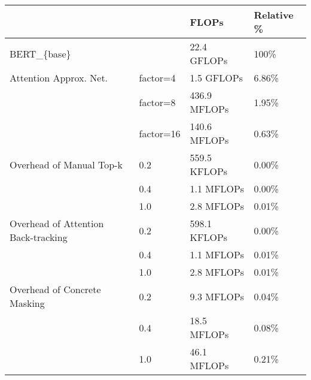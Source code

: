 \begin{tabular}{llll}
\toprule
                             &     &         FLOPs & Relative \% \\
\midrule
BERT\_\{base\} & {} &   22.4 GFLOPs &       100\% \\
Attention Approx. Net. & factor=4 &    1.5 GFLOPs &      6.86\% \\
                             & factor=8 &  436.9 MFLOPs &      1.95\% \\
                             & factor=16 &  140.6 MFLOPs &      0.63\% \\
Overhead of Manual Top-k & 0.2 &  559.5 KFLOPs &      0.00\% \\
                             & 0.4 &    1.1 MFLOPs &      0.00\% \\
                             & 1.0 &    2.8 MFLOPs &      0.01\% \\
Overhead of Attention Back-tracking & 0.2 &  598.1 KFLOPs &      0.00\% \\
                             & 0.4 &    1.1 MFLOPs &      0.01\% \\
                             & 1.0 &    2.8 MFLOPs &      0.01\% \\
Overhead of Concrete Masking & 0.2 &    9.3 MFLOPs &      0.04\% \\
                             & 0.4 &   18.5 MFLOPs &      0.08\% \\
                             & 1.0 &   46.1 MFLOPs &      0.21\% \\
\bottomrule
\end{tabular}
